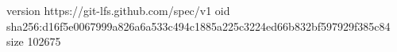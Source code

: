 version https://git-lfs.github.com/spec/v1
oid sha256:d16f5e0067999a826a6a533c494c1885a225c3224ed66b832bf597929f385c84
size 102675
